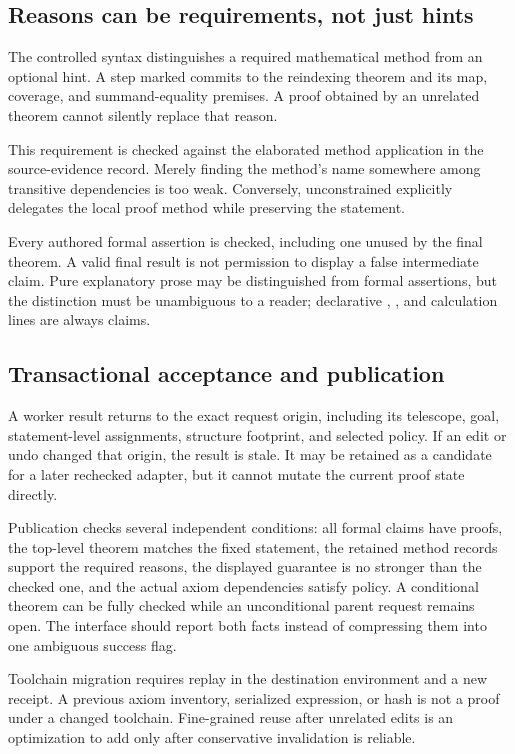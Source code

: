 \documentclass[11pt,a4paper]{article}
\newcommand{\code}[1]{\texttt{\detokenize{#1}}}
\theoremstyle{plain}
\theoremstyle{definition}
\begin{document}
\subsection{Reasons can be requirements, not just hints}
The controlled syntax distinguishes a required mathematical method from an optional hint. A step marked \code{by reindex k = j+i} commits to the reindexing theorem and its map, coverage, and summand-equality premises. A proof obtained by an unrelated theorem cannot silently replace that reason.

This requirement is checked against the elaborated method application in the source-evidence record. Merely finding the method's name somewhere among transitive dependencies is too weak. Conversely, unconstrained \code{by search} explicitly delegates the local proof method while preserving the statement.

Every authored formal assertion is checked, including one unused by the final theorem. A valid final result is not permission to display a false intermediate claim. Pure explanatory prose may be distinguished from formal assertions, but the distinction must be unambiguous to a reader; declarative \code{have}, \code{hence}, and calculation lines are always claims.

\subsection{Transactional acceptance and publication}
A worker result returns to the exact request origin, including its telescope, goal, statement-level assignments, structure footprint, and selected policy. If an edit or undo changed that origin, the result is stale. It may be retained as a candidate for a later rechecked adapter, but it cannot mutate the current proof state directly.

Publication checks several independent conditions: all formal claims have proofs, the top-level theorem matches the fixed statement, the retained method records support the required reasons, the displayed guarantee is no stronger than the checked one, and the actual axiom dependencies satisfy policy. A conditional theorem can be fully checked while an unconditional parent request remains open. The interface should report both facts instead of compressing them into one ambiguous success flag.

Toolchain migration requires replay in the destination environment and a new receipt. A previous axiom inventory, serialized expression, or hash is not a proof under a changed toolchain. Fine-grained reuse after unrelated edits is an optimization to add only after conservative invalidation is reliable.
\end{document}

